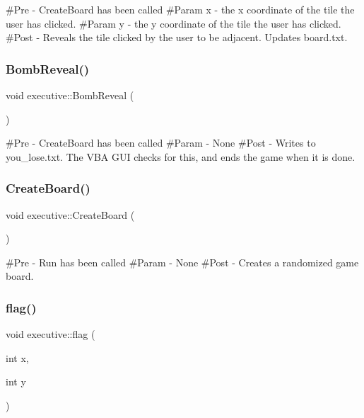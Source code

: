 \#\+Pre -\/ Create\+Board has been called \#\+Param x -\/ the x coordinate of the tile the user has clicked. \#\+Param y -\/ the y coordinate of the tile the user has clicked. \#\+Post -\/ Reveals the tile clicked by the user to be adjacent. Updates board.\+txt. \mbox{\label{classexecutive_a75c3e0d1420e409b8e955fc88d885b8b}} 
\subsubsection{\texorpdfstring{BombReveal()}{BombReveal()}}
{\footnotesize\ttfamily void executive\+::\+Bomb\+Reveal (\begin{DoxyParamCaption}{ }\end{DoxyParamCaption})}

\#\+Pre -\/ Create\+Board has been called \#\+Param -\/ None \#\+Post -\/ Writes to you\+\_\+lose.\+txt. The V\+BA G\+UI checks for this, and ends the game when it is done. \mbox{\label{classexecutive_adccfcb025102490e13fd355d9c8bb3e8}} 
\subsubsection{\texorpdfstring{CreateBoard()}{CreateBoard()}}
{\footnotesize\ttfamily void executive\+::\+Create\+Board (\begin{DoxyParamCaption}{ }\end{DoxyParamCaption})}

\#\+Pre -\/ Run has been called \#\+Param -\/ None \#\+Post -\/ Creates a randomized game board. \mbox{\label{classexecutive_a3f1b98d200affb24d1fefb92284d8841}} 
\subsubsection{\texorpdfstring{flag()}{flag()}}
{\footnotesize\ttfamily void executive\+::flag (\begin{DoxyParamCaption}\item[{int}]{x,  }\item[{int}]{y }\end{DoxyParamCaption})}

